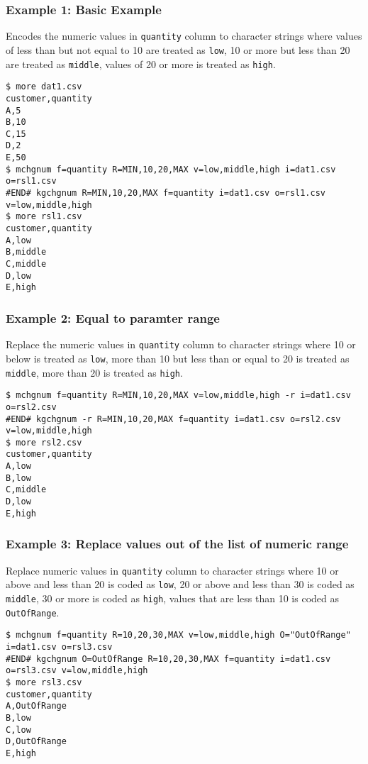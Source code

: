 \subsubsection*{Example 1: Basic Example}

Encodes the numeric values in \verb|quantity| column to character strings where values of less than but not equal to 10 are treated as \verb|low|, 10 or more but less than 20 are treated as \verb|middle|, values of 20 or more is treated as \verb|high|.


\begin{Verbatim}[baselinestretch=0.7,frame=single]
$ more dat1.csv
customer,quantity
A,5
B,10
C,15
D,2
E,50
$ mchgnum f=quantity R=MIN,10,20,MAX v=low,middle,high i=dat1.csv o=rsl1.csv
#END# kgchgnum R=MIN,10,20,MAX f=quantity i=dat1.csv o=rsl1.csv v=low,middle,high
$ more rsl1.csv
customer,quantity
A,low
B,middle
C,middle
D,low
E,high
\end{Verbatim}
\subsubsection*{Example 2: Equal to paramter range}

Replace the numeric values in \verb|quantity| column to character strings where 10 or below is treated as \verb|low|, more than 10 but less than or equal to 20 is treated as \verb|middle|, more than 20 is treated as \verb|high|.


\begin{Verbatim}[baselinestretch=0.7,frame=single]
$ mchgnum f=quantity R=MIN,10,20,MAX v=low,middle,high -r i=dat1.csv o=rsl2.csv
#END# kgchgnum -r R=MIN,10,20,MAX f=quantity i=dat1.csv o=rsl2.csv v=low,middle,high
$ more rsl2.csv
customer,quantity
A,low
B,low
C,middle
D,low
E,high
\end{Verbatim}
\subsubsection*{Example 3: Replace values out of the list of numeric range}

Replace numeric values in \verb|quantity| column to character strings  where 10 or above and less than 20 is coded as \verb|low|, 20 or above and less than 30 is coded as \verb|middle|, 30 or more is coded as \verb|high|, values that are less than 10 is coded as \verb|OutOfRange|.


\begin{Verbatim}[baselinestretch=0.7,frame=single]
$ mchgnum f=quantity R=10,20,30,MAX v=low,middle,high O="OutOfRange" i=dat1.csv o=rsl3.csv
#END# kgchgnum O=OutOfRange R=10,20,30,MAX f=quantity i=dat1.csv o=rsl3.csv v=low,middle,high
$ more rsl3.csv
customer,quantity
A,OutOfRange
B,low
C,low
D,OutOfRange
E,high
\end{Verbatim}
